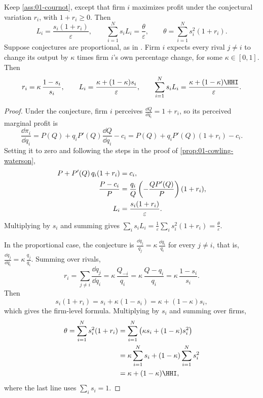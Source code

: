 \begin{proposition}\label{prop:01-clarke-davies}
Keep \cref{ass:01-cournot}, except that firm $i$ maximizes profit under the conjectural variation $r_i$, with
$1 + r_i \ge 0$. Then
\begin{equation}\label{eq:01-cv-lerner}
  L_i = \frac{s_i (1 + r_i)}{\varepsilon}, \qquad
  \sum_{i=1}^{N} s_i L_i = \frac{\theta}{\varepsilon}, \qquad
  \theta = \sum_{i=1}^{N} s_i^2 (1 + r_i) .
\end{equation}
Suppose conjectures are proportional, as in \citet{ClarkeDavies1982}. Firm $i$ expects every rival $j \ne i$ to
change its output by $\kappa$ times firm $i$'s own percentage change, for some $\kappa \in [0, 1]$. Then
\begin{equation}\label{eq:01-clarke-davies}
  r_i = \kappa\,\frac{1 - s_i}{s_i}, \qquad
  L_i = \frac{\kappa + (1 - \kappa)s_i}{\varepsilon}, \qquad
  \sum_{i=1}^{N} s_i L_i = \frac{\kappa + (1 - \kappa)\HHI}{\varepsilon} .
\end{equation}
\end{proposition}

\begin{proof}
Under the conjecture, firm $i$ perceives $\frac{\dd Q}{\dd q_i} = 1 + r_i$, so its perceived marginal profit is
\[
  \frac{\dd \pi_i}{\dd q_i} = P(Q) + q_i P'(Q) \frac{\dd Q}{\dd q_i} - c_i = P(Q) + q_i P'(Q)(1 + r_i) - c_i .
\]
Setting it to zero and following the steps in the proof of \cref{prop:01-cowling-waterson},
\begin{align}
  P + P'(Q)\, q_i (1 + r_i) &= c_i, \label{eq:01-cv-foc}\\
  \frac{P - c_i}{P} &= \frac{q_i}{Q}\left(-\frac{Q P'(Q)}{P}\right)(1 + r_i), \notag\\
  L_i &= \frac{s_i (1 + r_i)}{\varepsilon} . \notag
\end{align}
Multiplying by $s_i$ and summing gives
$\sum_i s_i L_i = \frac{1}{\varepsilon}\sum_i s_i^2 (1 + r_i) = \frac{\theta}{\varepsilon}$.

In the proportional case, the conjecture is $\frac{\dd q_j}{q_j} = \kappa\,\frac{\dd q_i}{q_i}$ for every
$j \ne i$, that is, $\frac{\dd q_j}{\dd q_i} = \kappa\,\frac{q_j}{q_i}$. Summing over rivals,
\[
  r_i = \sum_{j \ne i} \frac{\dd q_j}{\dd q_i} = \kappa\,\frac{Q_{-i}}{q_i} = \kappa\,\frac{Q - q_i}{q_i}
  = \kappa\,\frac{1 - s_i}{s_i} .
\]
Then
\[
  s_i (1 + r_i) = s_i + \kappa (1 - s_i) = \kappa + (1 - \kappa) s_i ,
\]
which gives the firm-level formula. Multiplying by $s_i$ and summing over firms,
\begin{align*}
  \theta = \sum_{i=1}^{N} s_i^2 (1 + r_i) &= \sum_{i=1}^{N} \left(\kappa s_i + (1 - \kappa) s_i^2\right) \\
  &= \kappa \sum_{i=1}^{N} s_i + (1 - \kappa) \sum_{i=1}^{N} s_i^2 \\
  &= \kappa + (1 - \kappa)\HHI ,
\end{align*}
where the last line uses $\sum_i s_i = 1$.
\end{proof}

